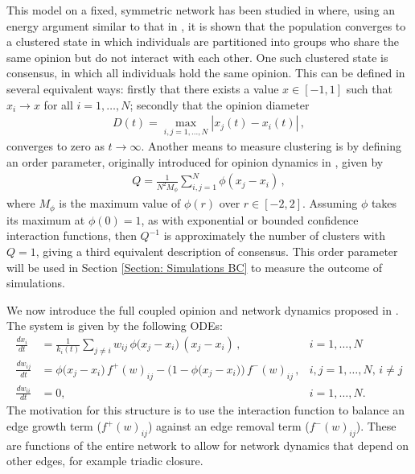 \documentclass{article}
\begin{document}
This model on a fixed, symmetric network has been studied in \cite{nugent2023evolving} where, using an energy argument similar to that in \cite{motsch_heterophilious_2014}, it is shown that the population converges to a clustered state in which individuals are partitioned into groups who share the same opinion but do not interact with each other. One such clustered state is consensus, in which all individuals hold the same opinion. This can be defined in several equivalent ways: firstly that there exists a value $x\in[-1,1]$ such that $x_i\rightarrow x$ for all $i=1,\dots,N$; secondly that the opinion diameter
\begin{align*}
    D(t) = \max_{i,j=1,\dots,N} |x_j(t) - x_i(t) | \,,
\end{align*}
converges to zero as $t\rightarrow\infty$. Another means to measure clustering is by defining an order parameter, originally introduced for opinion dynamics in \cite{wang2017noisy}, given by 
\begin{align} \label{eqn: order parameter}
    Q = \frac{1}{N^2 M_\phi} \sum_{i,j=1}^N \phi(x_j - x_i)  \,,
\end{align}
where $M_\phi$ is the maximum value of $\phi(r)$ over $r\in[-2,2]$. Assuming $\phi$ takes its maximum at $\phi(0)=1$, as with exponential or bounded confidence interaction functions, then $Q^{-1}$ is approximately the number of clusters with $Q=1$, giving a third equivalent description of consensus. This order parameter will be used in Section \ref{Section: Simulations BC} to measure the outcome of simulations. 

We now introduce the full coupled opinion and network dynamics proposed in \cite{nugent2023evolving}. The system is given by the following ODEs:
\begin{subequations} \label{Eqn: general dynamic network system}
\begin{align}
    \frac{dx_i}{dt} &= \frac{1}{k_i(t)} \sum_{j\neq i} w_{ij}\,\phi\big(x_j - x_i\big)\,(x_j - x_i) \,, & i = 1,\dots,N \label{Eqn: general dynamic network system x_i}\\
    \frac{dw_{ij}}{dt} &= \phi\big(x_j - x_i\big)\, f^+(w)_{ij} - \Big(1 - \phi\big(x_j - x_i\big)\Big)\, f^-(w)_{ij} \,, & i,j = 1,\dots,N,\, i\neq j \label{Eqn: general dynamic network system w_ij} \\[0.5em]
    \frac{dw_{ii}}{dt} &= 0, & i = 1,\dots,N.
\end{align}
\end{subequations}
The motivation for this structure is to use the interaction function to balance an edge growth term ($f^+(w)_{ij}$) against an edge removal term ($f^-(w)_{ij}$). These are functions of the entire network to allow for network dynamics that depend on other edges, for example triadic closure. 
\end{document}
